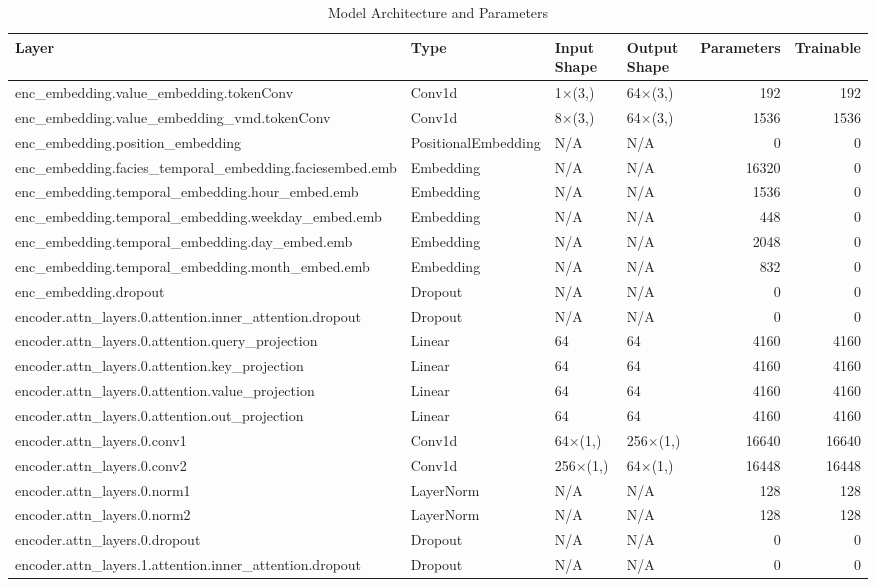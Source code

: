 \begin{table}
\caption{Model Architecture and Parameters}
\label{tab:model_structure}
\begin{tabular}{llllrr}
\toprule
Layer & Type & Input Shape & Output Shape & Parameters & Trainable \\
\midrule
enc_embedding.value_embedding.tokenConv & Conv1d & 1×(3,) & 64×(3,) & 192 & 192 \\
enc_embedding.value_embedding_vmd.tokenConv & Conv1d & 8×(3,) & 64×(3,) & 1536 & 1536 \\
enc_embedding.position_embedding & PositionalEmbedding & N/A & N/A & 0 & 0 \\
enc_embedding.facies_temporal_embedding.faciesembed.emb & Embedding & N/A & N/A & 16320 & 0 \\
enc_embedding.temporal_embedding.hour_embed.emb & Embedding & N/A & N/A & 1536 & 0 \\
enc_embedding.temporal_embedding.weekday_embed.emb & Embedding & N/A & N/A & 448 & 0 \\
enc_embedding.temporal_embedding.day_embed.emb & Embedding & N/A & N/A & 2048 & 0 \\
enc_embedding.temporal_embedding.month_embed.emb & Embedding & N/A & N/A & 832 & 0 \\
enc_embedding.dropout & Dropout & N/A & N/A & 0 & 0 \\
encoder.attn_layers.0.attention.inner_attention.dropout & Dropout & N/A & N/A & 0 & 0 \\
encoder.attn_layers.0.attention.query_projection & Linear & 64 & 64 & 4160 & 4160 \\
encoder.attn_layers.0.attention.key_projection & Linear & 64 & 64 & 4160 & 4160 \\
encoder.attn_layers.0.attention.value_projection & Linear & 64 & 64 & 4160 & 4160 \\
encoder.attn_layers.0.attention.out_projection & Linear & 64 & 64 & 4160 & 4160 \\
encoder.attn_layers.0.conv1 & Conv1d & 64×(1,) & 256×(1,) & 16640 & 16640 \\
encoder.attn_layers.0.conv2 & Conv1d & 256×(1,) & 64×(1,) & 16448 & 16448 \\
encoder.attn_layers.0.norm1 & LayerNorm & N/A & N/A & 128 & 128 \\
encoder.attn_layers.0.norm2 & LayerNorm & N/A & N/A & 128 & 128 \\
encoder.attn_layers.0.dropout & Dropout & N/A & N/A & 0 & 0 \\
encoder.attn_layers.1.attention.inner_attention.dropout & Dropout & N/A & N/A & 0 & 0 \\

\end{tabular}
\end{table}
